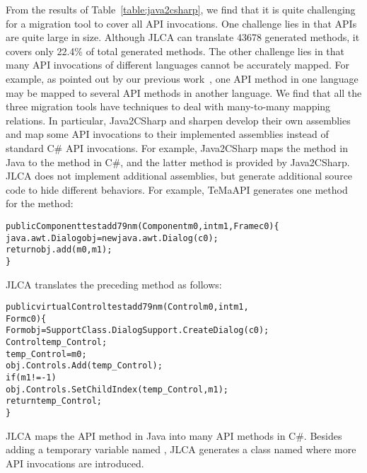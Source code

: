 From the results of Table~\ref{table:java2csharp}, we find that it is quite challenging for a migration tool to cover all API invocations. One challenge lies in that APIs are quite large in size. Although JLCA can translate 43678 generated methods, it covers only 22.4\% of total generated methods. The other challenge lies in that many API invocations of different languages cannot be accurately mapped. For example, as pointed out by our previous work~\cite{zhong2010mining}, one API method in one language may be mapped to several API methods in another language. We find that all the three migration tools have techniques to deal with many-to-many mapping relations. In particular, Java2CSharp and sharpen develop their own assemblies and map some API invocations to their implemented assemblies instead of standard C\# API invocations. For example, Java2CSharp maps the  method in Java to the  method in C\#, and the latter method is provided by Java2CSharp. JLCA does not implement additional assemblies, but generate additional source code to hide different behaviors. For example, TeMaAPI generates one method for the   method:

\begin{CodeOut}%
\begin{alltt}
public Component testadd79nm(Component m0,int m1,Frame c0)\{
  java.awt.Dialog obj = new java.awt.Dialog(c0);
  return obj.add(m0,m1);
\}
\end{alltt}
\end{CodeOut}

JLCA translates the preceding method as follows:

\begin{CodeOut}%
\begin{alltt}
public virtual Control testadd79nm(Control m0, int m1,
                                              Form c0)\{
  Form obj = SupportClass.DialogSupport.CreateDialog(c0);
  Control temp_Control;
  temp_Control = m0;
  obj.Controls.Add(temp_Control);
  if (m1 != -1)
    obj.Controls.SetChildIndex(temp_Control, m1);
  return temp_Control;
\}
\end{alltt}
\end{CodeOut}

JLCA maps the API method in Java into many API methods in C\#. Besides adding a temporary variable named , JLCA generates a class named  where more API invocations are introduced.

